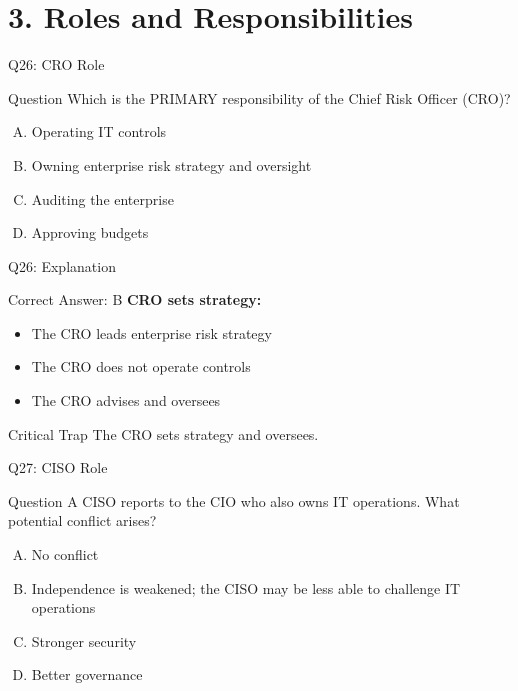 \documentclass{beamer}
\begin{document}
	\section{3. Roles and Responsibilities}
	
	\begin{frame}{Q26: CRO Role}
		\begin{block}{Question}
			Which is the PRIMARY responsibility of the Chief Risk Officer (CRO)?
		\end{block}
		\begin{enumerate}[(A)]
			\item Operating IT controls
			\item Owning enterprise risk strategy and oversight
			\item Auditing the enterprise
			\item Approving budgets
		\end{enumerate}
	\end{frame}
	
	\begin{frame}{Q26: Explanation}
		\begin{block}{Correct Answer: B}
			\textbf{CRO sets strategy:}
			\begin{itemize}
				\item The CRO leads enterprise risk strategy
				\item The CRO does not operate controls
				\item The CRO advises and oversees
			\end{itemize}
		\end{block}
		\begin{alertblock}{Critical Trap}
			The CRO sets strategy and oversees.
		\end{alertblock}
	\end{frame}
	
	\begin{frame}{Q27: CISO Role}
		\begin{block}{Question}
			A CISO reports to the CIO who also owns IT operations. What potential conflict arises?
		\end{block}
		\begin{enumerate}[(A)]
			\item No conflict
			\item Independence is weakened; the CISO may be less able to challenge IT operations
			\item Stronger security
			\item Better governance
		\end{enumerate}
	\end{frame}
	
\end{document}
